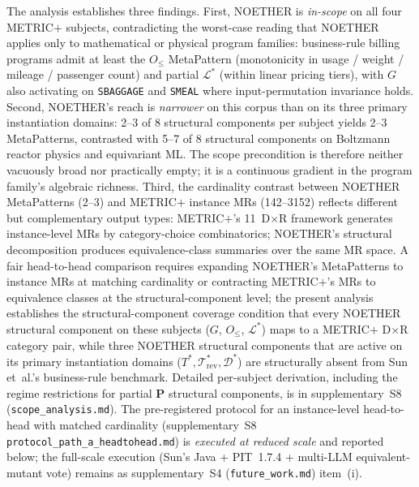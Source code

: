\documentclass[acmsmall,screen,review]{acmart}
\newcommand{\tildemark}{\textbf{P}}
\begin{document}
The analysis establishes three findings. First, NOETHER is
\emph{in-scope} on all four METRIC$+$ subjects, contradicting the
worst-case reading that NOETHER applies only to mathematical or
physical program families: business-rule billing programs admit at
least the $O_{\le}$ MetaPattern (monotonicity in usage / weight / mileage /
passenger count) and partial $\mathcal{L}^{*}$ (within linear pricing
tiers), with $G$ also activating on \texttt{SBAGGAGE} and
\texttt{SMEAL} where input-permutation invariance holds. Second,
NOETHER's reach is \emph{narrower} on this corpus than on its three
primary instantiation domains: 2--3 of 8 structural components per subject yields
2--3 MetaPatterns, contrasted with 5--7 of 8 structural components on Boltzmann
reactor physics and equivariant ML. The scope precondition is
therefore neither vacuously broad nor practically empty; it is a
continuous gradient in the program family's algebraic richness.
Third, the cardinality contrast between NOETHER MetaPatterns (2--3)
and METRIC$+$ instance MRs (142--3152) reflects different but
complementary output types: METRIC$+$'s 11~D$\times$R framework
generates instance-level MRs by category-choice combinatorics;
NOETHER's structural decomposition produces equivalence-class
summaries over the same MR space. A fair head-to-head comparison
requires expanding NOETHER's MetaPatterns to instance MRs at
matching cardinality or contracting METRIC$+$'s MRs to equivalence
classes at the structural-component level; the present analysis establishes
the structural-component coverage condition that every NOETHER structural component on
these subjects ($G$, $O_{\le}$, $\mathcal{L}^{*}$) maps to a
METRIC$+$ D$\times$R category pair, while three NOETHER structural components that
are active on its primary instantiation domains
($T^{*}, \mathcal{T}^{*}_{\mathrm{rev}}, \mathcal{D}^{*}$) are
structurally absent from Sun et~al.'s business-rule benchmark.
Detailed per-subject derivation, including the regime restrictions
for partial \tildemark{} structural components, is in supplementary~S8
(\texttt{scope\_analysis.md}). The pre-registered protocol for an
instance-level head-to-head with matched cardinality
(supplementary~S8 \texttt{protocol\_path\_a\_headtohead.md}) is
\emph{executed at reduced scale} and reported below;
the full-scale execution (Sun's Java + PIT~1.7.4 + multi-LLM
equivalent-mutant vote) remains as supplementary~S4 (\texttt{future\_work.md})
item~(i).
\end{document}

